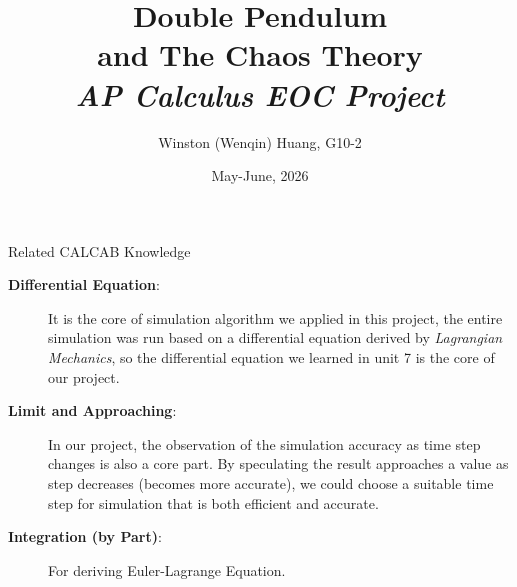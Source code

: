 \documentclass[aspectratio=169, 12pt]{beamer}
\title[Double Pendulum]{\Huge Double Pendulum\\ and The Chaos Theory \\ \vspace{0.5em} \normalsize \textit{AP Calculus EOC Project} \vspace{-1.5em}}
\author[Winston]{Winston (Wenqin) Huang, G10-2 \vspace{-1em}}
\institute{Olive Tree International Academy \vspace{-1em}}
\date{\small May-June, 2026}
\begin{document}
\begin{frame}
	\titlepage
\end{frame}


%        
%
%        

\begin{frame}{Related CALCAB Knowledge}
	\vspace{-2em}
	\begin{description}
		\item[\textbf{Differential Equation}:]{It is the core of simulation algorithm we applied in this project, the entire simulation was run based on a differential equation derived by \textit{Lagrangian Mechanics}, so the differential equation we learned in unit 7 is the core of our project.}
		\item[\textbf{Limit and Approaching}:]{In our project, the observation of the simulation accuracy as time step changes is also a core part. By speculating the result approaches a value as step decreases (becomes more accurate), we could choose a suitable time step for simulation that is both efficient and accurate.}
		\item[\textbf{Integration (by Part)}:]{For deriving Euler-Lagrange Equation.}
	\end{description}

\end{frame}
\end{document}
